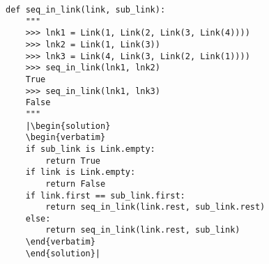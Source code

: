 \begin{lstlisting}
def seq_in_link(link, sub_link):
    """
    >>> lnk1 = Link(1, Link(2, Link(3, Link(4))))
    >>> lnk2 = Link(1, Link(3))
    >>> lnk3 = Link(4, Link(3, Link(2, Link(1))))
    >>> seq_in_link(lnk1, lnk2)
    True
    >>> seq_in_link(lnk1, lnk3)
    False
    """
    |\begin{solution}
    \begin{verbatim}
    if sub_link is Link.empty:
        return True
    if link is Link.empty:
        return False
    if link.first == sub_link.first:
        return seq_in_link(link.rest, sub_link.rest)
    else:
        return seq_in_link(link.rest, sub_link)
    \end{verbatim}
    \end{solution}|
\end{lstlisting}